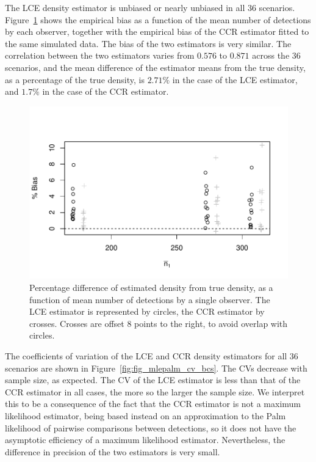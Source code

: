\documentclass[useAMS, usenatbib, referee]{biom}\usepackage[]{graphicx}\usepackage[]{color}
\makeatletter
\def\maxwidth{ %
  \ifdim\Gin@nat@width>\linewidth
    \linewidth
  \else
    \Gin@nat@width
  \fi
}
\newenvironment{knitrout}{}{} %
\makeatother
\begin{document}
The LCE density estimator is unbiased or nearly unbiased in all 36 scenarios. Figure~\ref{fig:fig_mlepalm_bias_bcs} shows the empirical bias as a function of the mean number of detections by each observer, together with the empirical bias of the CCR estimator fitted to the same simulated data. The bias of the two estimators is very similar. The correlation between the two estimators varies from $0.576$ to $0.871$ across the 36 scenarios, and the mean difference of the estimator means from the true density, as a percentage of the true density, is $2.71\%$ in the case of the LCE estimator, and $1.7\%$ in the case of the CCR estimator.

\begin{knitrout}
\color{fgcolor}\begin{figure}

{\centering \includegraphics[width=\maxwidth]{figs/fig_mlepalm_bias_bcs-1} 

}

\caption[Percentage difference of estimated density from true density, as a function of mean number of detections by a single observer]{Percentage difference of estimated density from true density, as a function of mean number of detections by a single observer. The LCE estimator is represented by circles, the CCR estimator by crosses. Crosses are offset 8 points to the right, to avoid overlap with circles.}\label{fig:fig_mlepalm_bias_bcs}
\end{figure}


\end{knitrout}



The coefficients of variation of the LCE and CCR density estimators for all 36 scenarios are shown in Figure~\ref{fig:fig_mlepalm_cv_bcs}. The CVs decrease with sample size, as expected. The CV of the LCE estimator is less than that of the CCR estimator in all cases, the more so the larger the sample size. We interpret this to be a consequence of the fact that the CCR estimator is not a maximum likelihood estimator, being based instead on an approximation to the Palm likelihood of pairwise comparisons between detections, so it does not have the asymptotic efficiency of a maximum likelihood estimator. Nevertheless, the difference in precision of the two estimators is very small.
\end{document}
